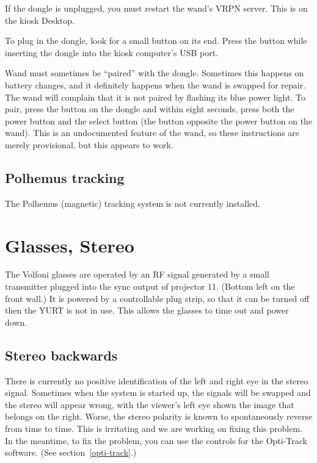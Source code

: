 \documentclass[11pt]{article}
\newcommand{\yurt}{YURT\xspace}
\begin{document}
If the dongle is unplugged, you must restart the wand's VRPN server.
This is on the kiosk Desktop.


To plug in the dongle, look for a small button on its end.  Press the
button while inserting the dongle into the kiosk computer's USB port.

Wand must sometimes be ``paired'' with the dongle.  Sometimes this
happens on battery changes, and it definitely happens when the wand is
swapped for repair.  The wand will complain that it is not paired by
flashing its blue power light.  To pair, press the button on the
dongle and within eight seconds, press both the power button and the
select button (the button opposite the power button on the wand).  This is an
undocumented feature of the wand, so these instructions are merely
provisional, but this appears to work.


\subsection{Polhemus tracking}

The Polhemus (magnetic) tracking system is not currently installed.





\section{Glasses, Stereo}

The Volfoni glasses are operated by an RF signal generated by a small
transmitter plugged into the sync output of projector 11.  (Bottom
left on the front wall.)  It is powered by a controllable plug strip,
so that it can be turned off then the \yurt is not in use.  This allows
the glasses to time out and power down.


\subsection{Stereo backwards}

There is currently no positive identification of the left and right
eye in the stereo signal.  Sometimes when the system is started
up, the signals will be swapped and the stereo will appear wrong, with
the viewer's left eye shown the image that belongs on the right.
Worse, the stereo polarity is known to spontaneously reverse from time to
time.  This is irritating and we are working on fixing this problem.
In the meantime, to fix the problem, you can use the controls for the
Opti-Track software.  (See section~\ref{opti-track}.)
\end{document}
